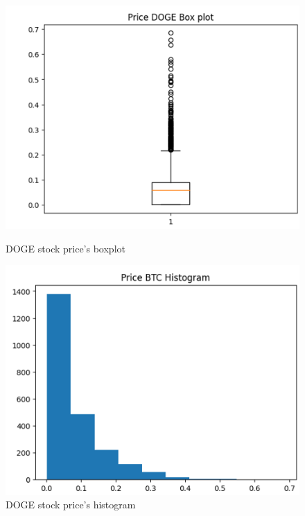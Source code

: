 \documentclass{ieeeojies}
\begin{document}
\begin{figure}[H]
    \centering
    \begin{minipage}{0.23\textwidth}
    \centering
    \includegraphics[width=1\textwidth]{bibliography/Figure/DOGE_BOXPLOT.png}
    \caption{DOGE stock price's boxplot}
    \label{fig:1}
    \end{minipage}
    \hfill
    \begin{minipage}{0.23\textwidth}
    \centering
    \includegraphics[width=1\textwidth]{bibliography/Figure/DOGE_HISTOGRAM.png}
    \caption{DOGE stock price's histogram}
    \label{fig:2}
    \end{minipage}
\end{figure}
\end{document}
